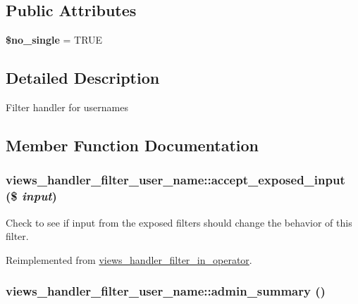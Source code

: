 \subsection*{Public Attributes}
\begin{CompactItemize}
\item 
\hypertarget{classviews__handler__filter__user__name_99b80557aa746560cdc5c90938e6e36b}{
\textbf{\$no\_\-single} = TRUE}
\label{classviews__handler__filter__user__name_99b80557aa746560cdc5c90938e6e36b}

\end{CompactItemize}


\subsection{Detailed Description}
Filter handler for usernames 

\subsection{Member Function Documentation}
\hypertarget{classviews__handler__filter__user__name_a6ae18031b13da1c92d83b8c5de74c15}{
\subsubsection[{accept\_\-exposed\_\-input}]{\setlength{\rightskip}{0pt plus 5cm}views\_\-handler\_\-filter\_\-user\_\-name::accept\_\-exposed\_\-input (\$ {\em input})}}
\label{classviews__handler__filter__user__name_a6ae18031b13da1c92d83b8c5de74c15}


Check to see if input from the exposed filters should change the behavior of this filter. 

Reimplemented from \hyperlink{classviews__handler__filter__in__operator_ff2b25941729b9ca81e1e53bb8e95a96}{views\_\-handler\_\-filter\_\-in\_\-operator}.\hypertarget{classviews__handler__filter__user__name_ba7659d0d6c937d9c346e8ed3af532b6}{
\subsubsection[{admin\_\-summary}]{\setlength{\rightskip}{0pt plus 5cm}views\_\-handler\_\-filter\_\-user\_\-name::admin\_\-summary ()}}
\label{classviews__handler__filter__user__name_ba7659d0d6c937d9c346e8ed3af532b6}


